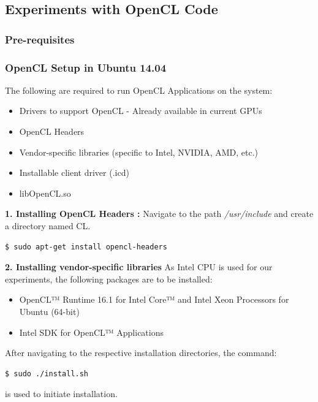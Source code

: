 \subsection{Experiments with OpenCL Code}
\label{3_1_3}
\subsubsection{Pre-requisites}
\label{3_1_3_1}
\subsubsection*{OpenCL Setup in Ubuntu 14.04}
The following are required to run OpenCL Applications on the system: 
\begin{itemize}
\item Drivers to support OpenCL - Already available in current GPUs
\item OpenCL Headers
\item Vendor-specific libraries (specific to Intel, NVIDIA, AMD, etc.)
\item Installable client driver (.icd)
\item libOpenCL.so 
\end{itemize} \textbf{1. Installing OpenCL Headers \cite{opencl_headers}:} \newline
Navigate to the path \textit{/usr/include} and create a directory named CL.
\begin{scriptsize}
\linuxbash
\begin{lstlisting}
$ sudo apt-get install opencl-headers
\end{lstlisting}
\end{scriptsize}
\textbf{2. Installing vendor-specific libraries} \newline
As Intel CPU is used for our experiments, the following packages are to be installed:
\begin{itemize}
\item OpenCL™ Runtime 16.1 for Intel Core™ and Intel Xeon Processors for Ubuntu (64-bit) \cite{intel_runtime}
\item Intel SDK for OpenCL™ Applications \cite{intel_openclSDK}
\end{itemize}
After navigating to the respective installation directories, the command: 
\begin{scriptsize}
\linuxbash
\begin{lstlisting}
$ sudo ./install.sh
\end{lstlisting}
\end{scriptsize}
is used to initiate installation. \newline\newline
